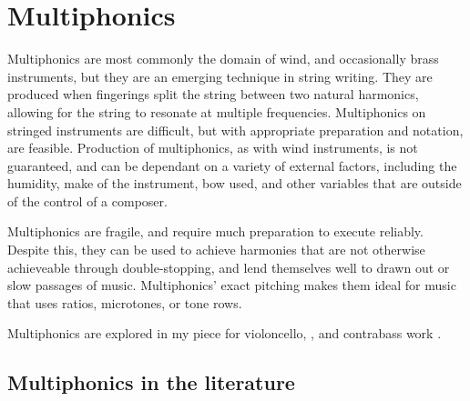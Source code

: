 


\newpage
\section{Multiphonics} \label{sec:multiphonicsDiscussion}

Multiphonics are most commonly the domain of wind, and occasionally brass instruments, but they are an emerging technique in string writing. 
They are produced when fingerings split the string between two natural harmonics, allowing for the string to resonate at multiple frequencies.
Multiphonics on stringed instruments are difficult, but with appropriate preparation and notation, are feasible. 
Production of multiphonics, as with wind instruments, is not guaranteed, and can be dependant on a variety of external factors, including the humidity, make of the instrument, bow used, and other variables that are outside of the control of a composer. 

Multiphonics are fragile, and require much preparation to execute reliably. 
Despite this, they can be used to achieve harmonies that are not otherwise achieveable through double-stopping, and lend themselves well to drawn out or slow passages of music. 
Multiphonics' exact pitching makes them ideal for music that uses ratios, microtones, or tone rows. 

Multiphonics are explored in my piece for violoncello, , and contrabass work .

\subsection{Multiphonics in the literature}

